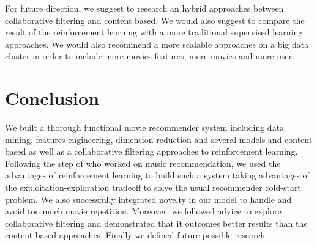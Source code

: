 \documentclass[letterpaper]{article}
\begin{document}
For future direction, we suggest to research an hybrid approaches between collaborative filtering and content based. We would also suggest to compare the result of the reinforcement learning with a more traditional supervised learning approaches. We would also recommend a more scalable approaches on a big data cluster in order to include more movies features, more movies and more user.


\section{Conclusion}

We built a thorough functional movie recommender system including data mining, features engineering, dimension reduction and several models and content based as well as a collaborative filtering approaches to reinforcement learning. 
Following the step of \cite{main} who worked on music recommendation, we used the advantages of reinforcement learning to build such a system taking advantages of the exploitation-exploration tradeoff to solve the usual recommender cold-start problem. We also successfully integrated novelty in our model to handle and avoid too much movie repetition. Moreover, we followed \cite{main} advice to explore collaborative filtering and demonstrated that it outcomes better results than the content based approaches. Finally we defined future possible research.


\footnotesize


\end{document}
